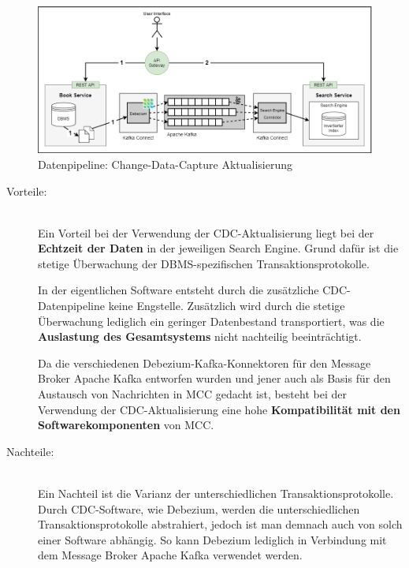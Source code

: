 \begin{figure}[H]
    \centering
    \includegraphics[width=0.9\linewidth]{images/CDC_aktualisierung.png}
    \caption{Datenpipeline: Change-Data-Capture Aktualisierung}
    \label{fig:changedatacapture_aktualisierung}
\end{figure}

\begin{description}
    \item[Vorteile:]\hfill \\
    Ein Vorteil bei der Verwendung der CDC-Aktualisierung liegt bei der \textbf{Echtzeit der Daten} in der jeweiligen Search Engine. Grund dafür ist die stetige Überwachung der DBMS-spezifischen Transaktionsprotokolle.

    In der eigentlichen Software entsteht durch die zusätzliche CDC-Datenpipeline keine Engstelle. Zusätzlich wird durch die stetige Überwachung lediglich ein geringer Datenbestand transportiert, was die \textbf{Auslastung des Gesamtsystems} nicht nachteilig beeinträchtigt.

    Da die verschiedenen Debezium-Kafka-Konnektoren für den Message Broker \glqq Apache Kafka\grqq{} entworfen wurden und jener auch als Basis für den Austausch von Nachrichten in MCC gedacht ist, besteht bei der Verwendung der CDC-Aktualisierung eine hohe \textbf{Kompatibilität mit den Softwarekomponenten} von MCC.
    
    \item[Nachteile:]\hfill \\
    Ein Nachteil ist die Varianz der unterschiedlichen Transaktionsprotokolle. Durch CDC-Software, wie \glqq Debezium\grqq{}, werden die unterschiedlichen Transaktionsprotokolle abstrahiert, jedoch ist man demnach auch von solch einer Software abhängig. So kann Debezium lediglich in Verbindung mit dem Message Broker \glqq Apache Kafka\grqq{} verwendet werden.

\end{description}

